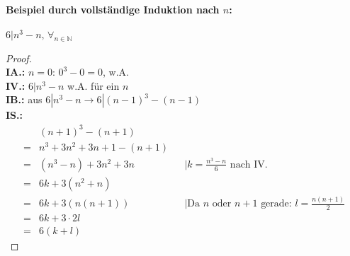 \documentclass[10pt,a4paper]{article}
\begin{document}
\paragraph{Beispiel durch vollständige Induktion nach $n$:}$6|n^3 -n,\, \forall_{n\in\mathbb{N}}$\\
\begin{proof}
\ \\
\textbf{IA.:} $n=0$: $0^3-0=0$, w.A. \\
\textbf{IV.:} $6|n^3 -n$ w.A. für ein $n$ \\
\textbf{IB.:} aus $6|n^3 -n \rightarrow 6|(n-1)^3 -(n-1)$ \\
\textbf{IS.:}
\begin{align*}
&(n+1)^3 - (n+1) \\
= &n^3+3n^2+3n+1-(n+1) \\
= &(n^3-n) + 3n^2 + 3n && |k=\frac{n^3-n}{6} \text{ nach IV.}\\
= &6k +3(n^2+n) \\
= &6k + 3(n(n+1)) && |\text{Da $n$ oder $n+1$ gerade: } l=\frac{n(n+1)}{2} \\
= &6k+3\cdot 2l \\
= &6(k+l)
\end{align*}
\end{proof}
\end{document}
